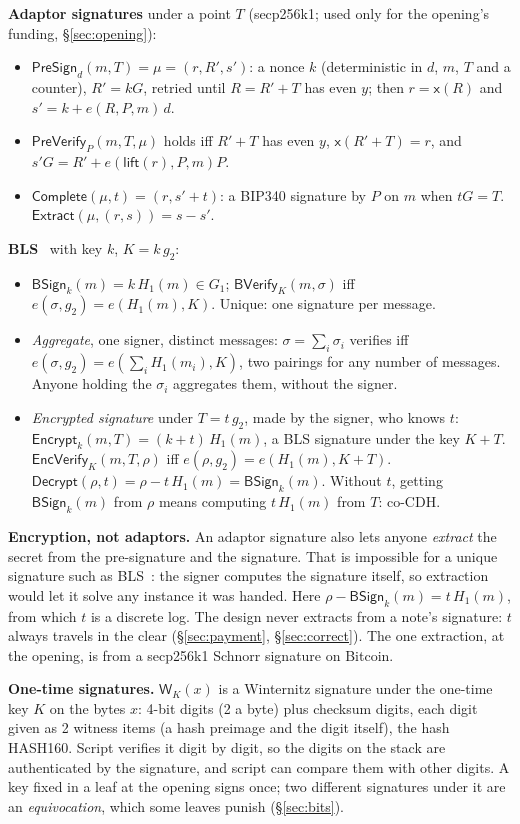 \documentclass[11pt]{article}
\theoremstyle{plain}
\theoremstyle{definition}
\newcommand{\xo}[1]{\mathsf{x}(#1)}
\newcommand{\PSign}{\mathsf{PreSign}}
\newcommand{\PVfy}{\mathsf{PreVerify}}
\newcommand{\Compl}{\mathsf{Complete}}
\newcommand{\Extr}{\mathsf{Extract}}
\newcommand{\Wots}{\mathsf{W}}
\newcommand{\BSign}{\mathsf{BSign}}
\newcommand{\BVfy}{\mathsf{BVerify}}
\newcommand{\Enc}{\mathsf{Encrypt}}
\newcommand{\EVfy}{\mathsf{EncVerify}}
\newcommand{\Dec}{\mathsf{Decrypt}}
\newcommand{\Hg}{H_{1}}
\begin{document}
\textbf{Adaptor signatures} under a point $T$ (secp256k1; used only
for the opening's funding, \S\ref{sec:opening}):
\begin{itemize}[nosep]
\item $\PSign_d(m, T) = \mu = (r, R', s')$: a nonce $k$ (deterministic
  in $d$, $m$, $T$ and a counter), $R' = kG$, retried until $R = R' + T$
  has even $y$; then $r = \xo{R}$ and $s' = k + e(R, P, m)\,d$.
\item $\PVfy_P(m, T, \mu)$ holds iff $R' + T$ has even $y$, $\xo{R' +
  T} = r$, and $s'G = R' + e(\mathsf{lift}(r), P, m)P$.
\item $\Compl(\mu, t) = (r, s' + t)$: a BIP340 signature by $P$ on $m$
  when $tG = T$. $\Extr(\mu, (r, s)) = s - s'$.
\end{itemize}

\textbf{BLS}~\cite{bls} with key $k$, $K = k\,g_2$:
\begin{itemize}[nosep]
\item $\BSign_k(m) = k\,\Hg(m) \in G_1$; $\BVfy_K(m, \sigma)$ iff
  $e(\sigma, g_2) = e(\Hg(m), K)$. Unique: one signature per message.
\item \emph{Aggregate}, one signer, distinct messages: $\sigma = \sum_i
  \sigma_i$ verifies iff $e(\sigma, g_2) = e(\sum_i \Hg(m_i), K)$, two
  pairings for any number of messages. Anyone holding the $\sigma_i$
  aggregates them, without the signer.
\item \emph{Encrypted signature} under $T = t\,g_2$, made by the signer,
  who knows $t$: $\Enc_k(m, T) = (k + t)\,\Hg(m)$, a BLS signature under
  the key $K + T$. $\EVfy_K(m, T, \rho)$ iff $e(\rho, g_2) = e(\Hg(m), K
  + T)$. $\Dec(\rho, t) = \rho - t\,\Hg(m) = \BSign_k(m)$. Without $t$,
  getting $\BSign_k(m)$ from $\rho$ means computing $t\,\Hg(m)$ from
  $T$: co-CDH.
\end{itemize}

\textbf{Encryption, not adaptors.} An adaptor signature also lets
anyone \emph{extract} the secret from the pre-signature and the
signature. That is impossible for a unique signature such as
BLS~\cite{erwig}: the signer computes the signature itself, so
extraction would let it solve any instance it was handed. Here
$\rho - \BSign_k(m) = t\,\Hg(m)$, from which $t$ is a discrete log. The
design never extracts from a note's signature: $t$ always travels in
the clear (\S\ref{sec:payment}, \S\ref{sec:correct}). The one
extraction, at the opening, is from a secp256k1 Schnorr signature on
Bitcoin.

\textbf{One-time signatures.} $\Wots_K(x)$ is a Winternitz signature
under the one-time key $K$ on the bytes $x$: 4-bit digits (2 a byte)
plus checksum digits, each digit given as 2 witness items (a hash
preimage and the digit itself), the hash HASH160. Script verifies it
digit by digit, so the digits on the stack are authenticated by the
signature, and script can compare them with other digits. A key fixed
in a leaf at the opening signs once; two different signatures under it
are an \emph{equivocation}, which some leaves punish
(\S\ref{sec:bits}).
\end{document}
